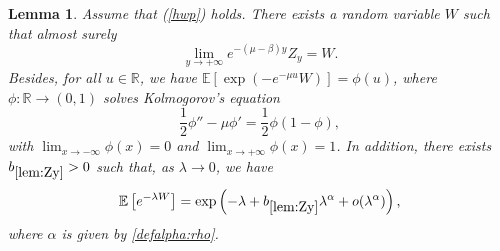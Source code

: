 \documentclass[11pt]{article}
\theoremstyle{plain}
\newtheorem{lemma}{Lemma}[section]
\begin{document}
\begin{lemma} \label{lem:Zy} Assume that (\ref{hwp}) holds.
There exists a random variable $W$ such that almost surely 
\begin{equation}
\lim_{y\to+\infty}e^{-(\mu-\beta)y}Z_y= W. \label{def:W}
\end{equation}
Besides, for all $u\in\mathbb{R}$, we have $\mathbb{E}\left[\exp\left(-e^{-\mu u}W\right)\right]=\phi(u)$, where $\phi:\mathbb{R}\rightarrow(0,1)$ solves Kolmogorov's equation
\begin{equation}
\frac{1}{2}\phi''-\mu\phi'=\frac{1}{2}\phi(1-\phi),\label{K:equation}
\end{equation}
with $\lim_{x\to-\infty}\phi(x)=0$ and $\lim_{x\to+\infty}\phi(x)=1$. In addition, there exists $b_{\ref{lem:Zy}}>0$ such that, as $\lambda\to 0$, we have 
\begin{equation}
\mathbb{E}\left[e^{-\lambda W}\right]=\exp\left(-\lambda+b_{\ref{lem:Zy}}\lambda^\alpha +o(\lambda^\alpha)\right), \label{TE:LTW}
\end{equation}
where $\alpha$ is given by \eqref{defalpha:rho}.
\end{lemma}
\end{document}
